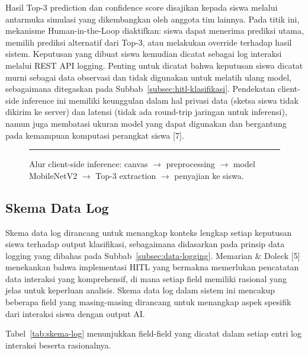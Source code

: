\documentclass[12pt,oneside]{report}
\begin{document}
Hasil Top-3 prediction dan confidence score disajikan kepada siswa melalui antarmuka simulasi yang dikembangkan oleh anggota tim lainnya. Pada titik ini, mekanisme Human-in-the-Loop diaktifkan: siswa dapat menerima prediksi utama, memilih prediksi alternatif dari Top-3, atau melakukan override terhadap hasil sistem. Keputusan yang dibuat siswa kemudian dicatat sebagai log interaksi melalui REST API logging. Penting untuk dicatat bahwa keputusan siswa dicatat murni sebagai data observasi dan tidak digunakan untuk melatih ulang model, sebagaimana ditegaskan pada Subbab~\ref{subsec:hitl-klasifikasi}. Pendekatan client-side inference ini memiliki keunggulan dalam hal privasi data (sketsa siswa tidak dikirim ke server) dan latensi (tidak ada round-trip jaringan untuk inferensi), namun juga membatasi ukuran model yang dapat digunakan dan bergantung pada kemampuan komputasi perangkat siswa [7].

\begin{figure}[H]
\centering
\rule{0.9\textwidth}{5cm}
\caption{Alur client-side inference: canvas $\rightarrow$ preprocessing $\rightarrow$ model MobileNetV2 $\rightarrow$ Top-3 extraction $\rightarrow$ penyajian ke siswa.}
\label{fig:client-side-inference}
\end{figure}

\subsection{Skema Data Log}
\label{subsec:skema-data-log}

Skema data log dirancang untuk menangkap konteks lengkap setiap keputusan siswa terhadap output klasifikasi, sebagaimana didasarkan pada prinsip data logging yang dibahas pada Subbab~\ref{subsec:data-logging}. Memarian \& Doleck [5] menekankan bahwa implementasi HITL yang bermakna memerlukan pencatatan data interaksi yang komprehensif, di mana setiap field memiliki rasional yang jelas untuk keperluan analisis. Skema data log dalam sistem ini mencakup beberapa field yang masing-masing dirancang untuk menangkap aspek spesifik dari interaksi siswa dengan output AI.

Tabel~\ref{tab:skema-log} menunjukkan field-field yang dicatat dalam setiap entri log interaksi beserta rasionalnya.
\end{document}

